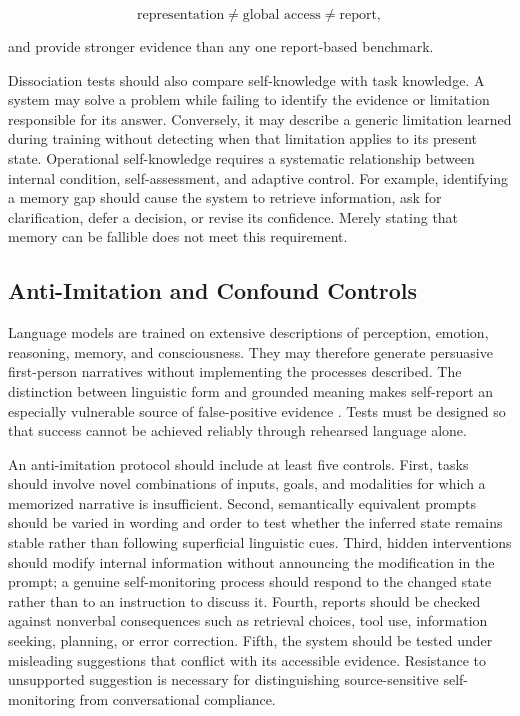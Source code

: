 \begin{equation}
\text{representation}
\neq
\text{global access}
\neq
\text{report},
\label{eq:dissociation-test}
\end{equation}

and provide stronger evidence than any one report-based benchmark.

Dissociation tests should also compare self-knowledge with task knowledge. A system may solve a problem while failing to identify the evidence or limitation responsible for its answer. Conversely, it may describe a generic limitation learned during training without detecting when that limitation applies to its present state. Operational self-knowledge requires a systematic relationship between internal condition, self-assessment, and adaptive control. For example, identifying a memory gap should cause the system to retrieve information, ask for clarification, defer a decision, or revise its confidence. Merely stating that memory can be fallible does not meet this requirement.

\subsection{Anti-Imitation and Confound Controls}

Language models are trained on extensive descriptions of perception, emotion, reasoning, memory, and consciousness. They may therefore generate persuasive first-person narratives without implementing the processes described. The distinction between linguistic form and grounded meaning makes self-report an especially vulnerable source of false-positive evidence \cite{bender2020climbing,mahowald2024dissociating}. Tests must be designed so that success cannot be achieved reliably through rehearsed language alone.

An anti-imitation protocol should include at least five controls. First, tasks should involve novel combinations of inputs, goals, and modalities for which a memorized narrative is insufficient. Second, semantically equivalent prompts should be varied in wording and order to test whether the inferred state remains stable rather than following superficial linguistic cues. Third, hidden interventions should modify internal information without announcing the modification in the prompt; a genuine self-monitoring process should respond to the changed state rather than to an instruction to discuss it. Fourth, reports should be checked against nonverbal consequences such as retrieval choices, tool use, information seeking, planning, or error correction. Fifth, the system should be tested under misleading suggestions that conflict with its accessible evidence. Resistance to unsupported suggestion is necessary for distinguishing source-sensitive self-monitoring from conversational compliance.

